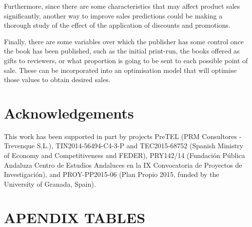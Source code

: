 \documentclass[a4paper,10pt,twocolumn,preprint,3p]{elsarticle}
\begin{document}
Furthermore, since there are some characteristics that may affect product sales 
significantly, another way to improve sales predictions could be making a 
thorough study of the effect of the application of discounts and promotions. 

Finally, there are some variables over which the publisher has some
control once the book has been published, such as the initial print-run, 
the books offered as gifts to reviewers, or what proportion is going to be sent 
to each possible point of sale. These can be incorporated into an optimisation 
model that will optimise those values to obtain desired sales. 


\section*{Acknowledgements}

This work has been supported in part by projects PreTEL (PRM Consultores - Trevenque S.L.), TIN2014-56494-C4-3-P and TEC2015-68752 (Spanish Ministry of Economy and Competitiveness and FEDER), PRY142/14 (Fundaci{\'o}n P{\'u}blica Andaluza Centro de Estudios Andaluces en la IX Convocatoria de Proyectos de Investigaci{\'o}n), and PROY-PP2015-06 (Plan Propio 2015, funded by the University of Granada, Spain).






\appendix
\section{APENDIX TABLES}
\end{document}

